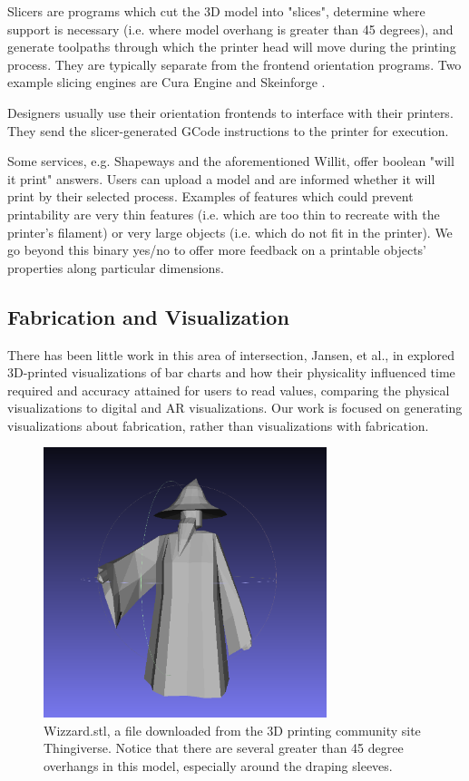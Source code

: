 \documentclass{sigchi}
\begin{document}
Slicers are programs which cut the 3D model into "slices", determine where support is necessary (i.e. where model overhang is greater than 45 degrees), and generate toolpaths through which the printer head will move during the printing process.  They are typically separate from the frontend orientation programs.  Two example slicing engines are Cura Engine \cite{cura-engine} and Skeinforge \cite{skeinforge}.

Designers usually use their orientation frontends to interface with their printers.  They send the slicer-generated GCode instructions to the printer for execution.

Some services, e.g. Shapeways \cite{shapeways} and the aforementioned Willit, offer boolean "will it print" answers.  Users can upload a model and are informed whether it will print by their selected process.  Examples of features which could prevent printability are very thin features (i.e. which are too thin to recreate with the printer's filament) or very large objects (i.e. which do not fit in the printer).  We go beyond this binary yes/no to offer more feedback on a printable objects' properties along particular dimensions.

\subsection{Fabrication and Visualization}
There has been little work in this area of intersection, Jansen, et al., in \cite{jansen-physvis} explored 3D-printed visualizations of bar charts and how their physicality influenced time required and accuracy attained for users to read values, comparing the physical visualizations to digital and AR visualizations.  Our work is focused on generating visualizations about fabrication, rather than visualizations with fabrication.

\begin{figure}
\centering
\includegraphics[width=3.25in]{images/wizzard.png}
\caption{Wizzard.stl, a file downloaded from the 3D printing community site Thingiverse.  Notice that there are several greater than 45 degree overhangs in this model, especially around the draping sleeves.}
\label{fig:wizzard}
\end{figure}
\end{document}
